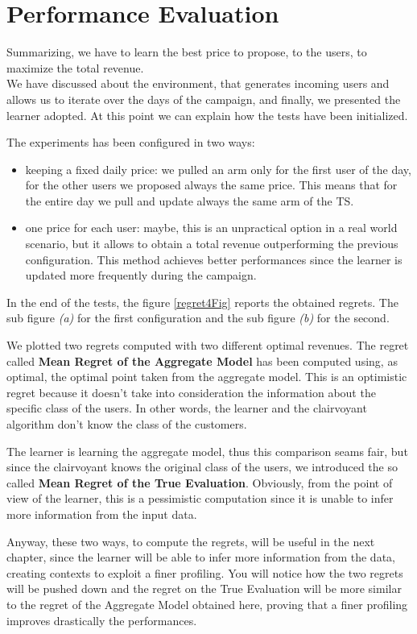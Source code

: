 \section{Performance Evaluation}

Summarizing, we have to learn the best price to propose, to the users, to maximize the total revenue.\\
We have discussed about the environment, that generates incoming users and allows us to iterate over the days of the campaign, and finally, we presented the learner adopted.
At this point we can explain how the tests have been initialized.

The experiments has been configured in two ways:
\begin{itemize}
    \item keeping a fixed daily price: we pulled an arm only for the first user of the day, for the other users we proposed always the same price. This means that for the entire day we pull and update always the same arm of the TS.
    \item one price for each user: maybe, this is an unpractical option in a real world scenario, but it allows to obtain a total revenue outperforming the previous configuration. This method achieves better performances since the learner is updated more frequently during the campaign.
\end{itemize}

In the end of the tests, the figure \ref{regret4Fig} reports the obtained regrets. The sub figure \textit{(a)} for the first configuration and the sub figure \textit{(b)} for the second.

We plotted two regrets computed with two different optimal revenues.
The regret called \textbf{Mean Regret of the Aggregate Model} has been computed using, as optimal, the optimal point taken from the aggregate model. This is an optimistic regret because it doesn't take into consideration the information about the specific class of the users. In other words, the learner and the clairvoyant algorithm don't know the class of the customers.

The learner is learning the aggregate model, thus this comparison seams fair, but since the clairvoyant knows the original class of the users, we introduced the so called \textbf{Mean Regret of the True Evaluation}. Obviously, from the point of view of the learner, this is a pessimistic computation since it is unable to infer more information from the input data.

Anyway, these two ways, to compute the regrets, will be useful in the next chapter, since the learner will be able to infer more information from the data, creating contexts to exploit a finer profiling.
You will notice how the two regrets will be pushed down and the regret on the True Evaluation will be more similar to the regret of the Aggregate Model obtained here, proving that a finer profiling improves drastically the performances.


